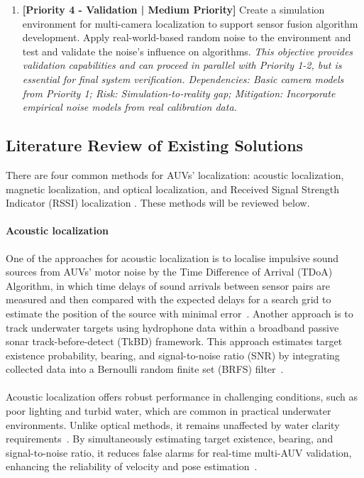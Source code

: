 \documentclass[11pt]{article}
\newcommand{\cn}[1]{\begin{CJK}{UTF8}{gbsn}#1\end{CJK}}
\newcommand{\yh}[1]{\noindent{\color{blue}\textbf{yh: }{\cn{#1}}}}
\begin{document}
\begin{enumerate}
        \item \textbf{[Priority 4 - Validation | Medium Priority]} Create a simulation environment for multi-camera localization to support sensor fusion algorithm development. Apply real-world-based random noise to the environment and test and validate the noise's influence on algorithms. \textit{This objective provides validation capabilities and can proceed in parallel with Priority 1-2, but is essential for final system verification. Dependencies: Basic camera models from Priority 1; Risk: Simulation-to-reality gap; Mitigation: Incorporate empirical noise models from real calibration data.}
    \end{enumerate}
    \subsection{Literature Review of Existing Solutions }
    There are four common methods for AUVs' localization: acoustic localization, magnetic localization, and optical localization, and Received Signal Strength Indicator (RSSI) localization
    . These methods will be reviewed below.
        \paragraph{Acoustic localization} 
        One of the approaches for acoustic localization is to localise impulsive sound sources from AUVs' motor noise by the Time Difference of Arrival (TDoA) Algorithm, in which time delays of sound arrivals between sensor pairs are measured and then compared with the expected delays for a search grid to estimate the position of the source with minimal error~\cite{mceachern_real-time_2024}. Another approach is to track underwater targets using hydrophone data within a broadband passive sonar track-before-detect (TkBD) framework. This approach estimates target existence probability, bearing, and signal-to-noise ratio (SNR) by integrating collected data into a Bernoulli random finite set (BRFS) filter~\cite{bosser_broadband_2024}.\\\\
        Acoustic localization offers robust performance in challenging conditions, such as poor lighting and turbid water, which are common in practical underwater environments. Unlike optical methods, it remains unaffected by water clarity requirements~\cite{mceachern_real-time_2024}. By simultaneously estimating target existence, bearing, and signal-to-noise ratio, it reduces false alarms for real-time multi-AUV validation, enhancing the reliability of velocity and pose estimation~\cite{bosser_broadband_2024}.
\end{document}
